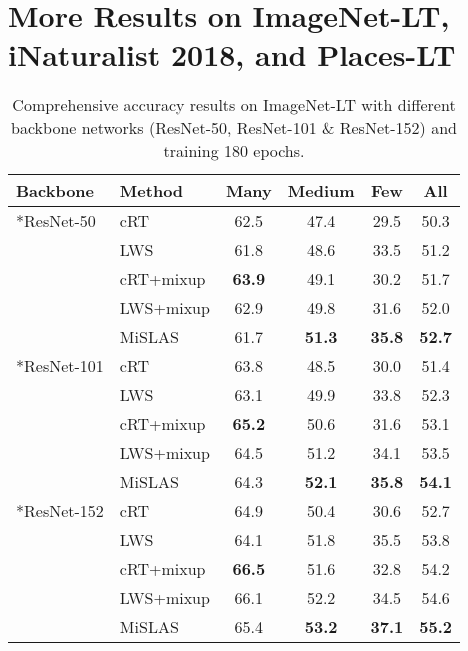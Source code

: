 \documentclass[final]{cvpr}
\begin{document}
	\section{More Results on ImageNet-LT, iNaturalist 2018, and Places-LT}\label{sec:more_result}
	\begin{table*}[h]
		\setlength{\tabcolsep}{20pt}
		\centering
		\begin{tabular}{l|l|cccc}
			\toprule[1.5pt]
			{\textbf{Backbone}}		& {\textbf{Method}}	 & Many & Medium & Few & All	\\ 
			\midrule
			{\multirow{5.1}*{ResNet-50}} & cRT & 62.5 & 47.4 & 29.5 & 50.3 \\
			& LWS & 61.8 & 48.6 & 33.5 & 51.2 \\
			& cRT+mixup & \textbf{63.9} & 49.1 & 30.2 & 51.7 \\
			& LWS+mixup& 62.9 & 49.8 & 31.6 & 52.0 \\
			& MiSLAS & 61.7 & \textbf{51.3} & \textbf{35.8} & \textbf{52.7} \\
\midrule
			{\multirow{5.1}*{ResNet-101}} & cRT& 63.8 & 48.5 & 30.0 & 51.4 \\
			& LWS & 63.1 & 49.9 & 33.8 & 52.3 \\
			& cRT+mixup& \textbf{65.2} & 50.6 & 31.6 & 53.1 \\
			& LWS+mixup& 64.5 & 51.2 & 34.1 & 53.5 \\
			& MiSLAS& 64.3 & \textbf{52.1} & \textbf{35.8} & \textbf{54.1} \\
			\midrule
			{\multirow{5.1}*{ResNet-152}} & cRT	& 64.9 & 50.4 & 30.6 & 52.7 \\
			& LWS & 64.1 & 51.8 & 35.5 & 53.8 \\
			& cRT+mixup & \textbf{66.5} & 51.6 & 32.8 & 54.2 \\
			& LWS+mixup & 66.1 & 52.2 & 34.5 & 54.6 \\
			& MiSLAS & 65.4 & \textbf{53.2} & \textbf{37.1} & \textbf{55.2} \\
			\bottomrule[1.5pt]     
		\end{tabular}
		\caption{Comprehensive accuracy results on ImageNet-LT with different backbone networks (ResNet-50, ResNet-101 \& ResNet-152) and training 180 epochs.}
		\vspace{-5pt}
		\label{tab:imgnet_more}
	\end{table*}
	
\end{document}
